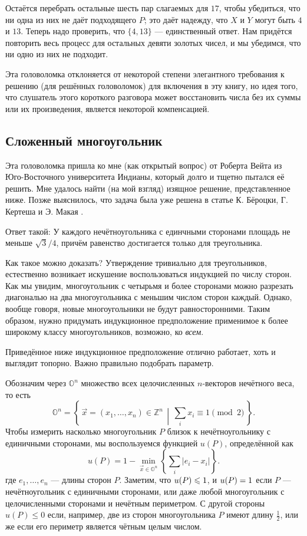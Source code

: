 Остаётся перебрать остальные шесть пар слагаемых для $17$, чтобы убедиться, что ни одна из них не даёт подходящего $P$;
это даёт надежду, что $X$ и $Y$ могут быть $4$ и $13$.
Теперь надо проверить, что $\{4, 13\}$ --- единственный ответ.
Нам придётся повторить весь процесс для остальных девяти золотых чисел, 
и мы убедимся, что ни одно из них не подходит.

Эта головоломка отклоняется от некоторой степени элегантного требования к решению (для решённых головоломок) для включения в эту книгу, но идея того, что слушатель этого короткого разговора может восстановить числа без их суммы или их произведения, является некоторой компенсацией.

\subsection*{Сложенный многоугольник}

Эта головоломка пришла ко мне (как открытый вопрос) от Роберта Вейта из Юго-Восточного университета Индианы, который долго и тщетно пытался её решить.
Мне удалось найти (на мой взгляд) изящное решение, представленное ниже.
Позже выяснилось, что задача была уже решена в статье К. Бёроцки, Г. Кертеша и Э. Макая \cite{9}.

Ответ такой: У каждого нечётноугольника с единчными сторонами площадь не меньше $\sqrt{3}/4$, причём равенство достигается только для треугольника.

Как такое можно доказать?
Утверждение тривиально для треугольников,
естественно возникает искушение воспользоваться индукцией по числу сторон.
Как мы увидим,  многоугольник с четырьмя и более сторонами можно разрезать диагональю на два многоугольника с меньшим числом сторон каждый.
Однако, вообще говоря, новые многоугольники не будут равносторонними.
Таким образом, нужно придумать индукционное предположение применимое к более широкому классу многоугольников, возможно, ко \emph{всем}.

Приведённое ниже индукционное предположение отлично работает, хоть и выглядит топорно.
Важно правильно подобрать параметр.

Обозначим через $\mathbb{O}^n$ множество всех целочисленных $n$-векторов нечётного веса, то есть 
\[\mathbb{O}^n=\left\{\,\vec x=(x_1,\dots,x_n)\in \mathbb{Z}^n\,\middle|\, \sum_ix_i\equiv 1\pmod 2\,\right\}.\]
Чтобы измерить насколько многоугольник $P$ близок к нечётноугольнику с единичными сторонами, мы воспользуемся функцией $u(P)$, определённой как
\[u(P)=1-\min_{\vec x\in \mathbb{O}^n} \left\{\sum_i |e_i-x_i|\right\}.\]
где  $e_1,\dots,e_n$ --- длины сторон $P$.
Заметим, что $u(P)\z\leqslant1$, и $u(P)\z=1$ если $P$ --- нечётноугольник с единичными сторонами, или даже любой многоугольник с целочисленными сторонами и нечётным периметром.
С другой стороны $u(P)\leqslant 0$ если, например, две из сторон многоугольника $P$ имеют длину $\tfrac12$, или же если его периметр является чётным целым числом.

